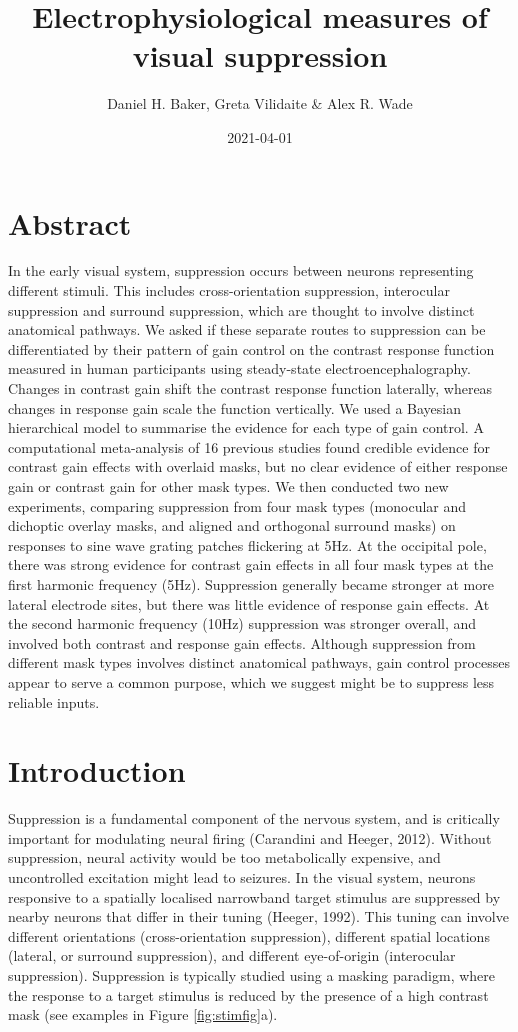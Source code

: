 \documentclass[]{article}
\title{Electrophysiological measures of visual suppression}
\author{Daniel H. Baker, Greta Vilidaite \& Alex R. Wade}
\date{2021-04-01}
\begin{document}
\maketitle

\hypertarget{abstract}{%
\section{Abstract}\label{abstract}}

In the early visual system, suppression occurs between neurons representing different stimuli. This includes cross-orientation suppression, interocular suppression and surround suppression, which are thought to involve distinct anatomical pathways. We asked if these separate routes to suppression can be differentiated by their pattern of gain control on the contrast response function measured in human participants using steady-state electroencephalography. Changes in contrast gain shift the contrast response function laterally, whereas changes in response gain scale the function vertically. We used a Bayesian hierarchical model to summarise the evidence for each type of gain control. A computational meta-analysis of 16 previous studies found credible evidence for contrast gain effects with overlaid masks, but no clear evidence of either response gain or contrast gain for other mask types. We then conducted two new experiments, comparing suppression from four mask types (monocular and dichoptic overlay masks, and aligned and orthogonal surround masks) on responses to sine wave grating patches flickering at 5Hz. At the occipital pole, there was strong evidence for contrast gain effects in all four mask types at the first harmonic frequency (5Hz). Suppression generally became stronger at more lateral electrode sites, but there was little evidence of response gain effects. At the second harmonic frequency (10Hz) suppression was stronger overall, and involved both contrast and response gain effects. Although suppression from different mask types involves distinct anatomical pathways, gain control processes appear to serve a common purpose, which we suggest might be to suppress less reliable inputs.

\hypertarget{introduction}{%
\section{Introduction}\label{introduction}}

Suppression is a fundamental component of the nervous system, and is critically important for modulating neural firing (Carandini and Heeger, 2012). Without suppression, neural activity would be too metabolically expensive, and uncontrolled excitation might lead to seizures. In the visual system, neurons responsive to a spatially localised narrowband target stimulus are suppressed by nearby neurons that differ in their tuning (Heeger, 1992). This tuning can involve different orientations (cross-orientation suppression), different spatial locations (lateral, or surround suppression), and different eye-of-origin (interocular suppression). Suppression is typically studied using a masking paradigm, where the response to a target stimulus is reduced by the presence of a high contrast mask (see examples in Figure \ref{fig:stimfig}a).
\end{document}
